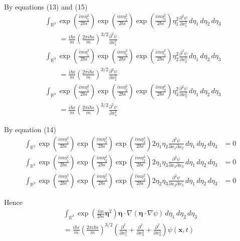 \documentclass[12pt]{article}
\begin{document}
By equations (13) and (15)
\begin{align*}
&\int_{\mathbb R^3}
\exp\left(\frac{im\eta_1^2}{2\hbar\epsilon}\right)
\exp\left(\frac{im\eta_2^2}{2\hbar\epsilon}\right)
\exp\left(\frac{im\eta_3^2}{2\hbar\epsilon}\right)
\eta_1^2\frac{\partial^2\psi}{\partial x_1^2}
\,d\eta_1\,d\eta_2\,d\eta_3
\\
&\qquad{}=\frac{i\hbar\epsilon}{m}\left(\frac{2\pi i\hbar\epsilon}{m}\right)^{3/2}
\frac{\partial^2\psi}{\partial x_1^2}
\\
&\int_{\mathbb R^3}
\exp\left(\frac{im\eta_1^2}{2\hbar\epsilon}\right)
\exp\left(\frac{im\eta_2^2}{2\hbar\epsilon}\right)
\exp\left(\frac{im\eta_3^2}{2\hbar\epsilon}\right)
\eta_2^2\frac{\partial^2\psi}{\partial x_2^2}
\,d\eta_1\,d\eta_2\,d\eta_3
\\
&\qquad{}=\frac{i\hbar\epsilon}{m}\left(\frac{2\pi i\hbar\epsilon}{m}\right)^{3/2}
\frac{\partial^2\psi}{\partial x_2^2}
\\
&\int_{\mathbb R^3}
\exp\left(\frac{im\eta_1^2}{2\hbar\epsilon}\right)
\exp\left(\frac{im\eta_2^2}{2\hbar\epsilon}\right)
\exp\left(\frac{im\eta_3^2}{2\hbar\epsilon}\right)
\eta_3^2\frac{\partial^2\psi}{\partial x_3^2}
\,d\eta_1\,d\eta_2\,d\eta_3
\\
&\qquad{}=\frac{i\hbar\epsilon}{m}\left(\frac{2\pi i\hbar\epsilon}{m}\right)^{3/2}
\frac{\partial^2\psi}{\partial x_3^2}
\end{align*}

By equation (14)
\begin{align*}
\int_{\mathbb R^3}
\exp\left(\frac{im\eta_1^2}{2\hbar\epsilon}\right)
\exp\left(\frac{im\eta_2^2}{2\hbar\epsilon}\right)
\exp\left(\frac{im\eta_3^2}{2\hbar\epsilon}\right)
2\eta_1\eta_2\frac{\partial^2\psi}{\partial x_1\partial x_2}
\,d\eta_1\,d\eta_2\,d\eta_3
&=0
\\
\int_{\mathbb R^3}
\exp\left(\frac{im\eta_1^2}{2\hbar\epsilon}\right)
\exp\left(\frac{im\eta_2^2}{2\hbar\epsilon}\right)
\exp\left(\frac{im\eta_3^2}{2\hbar\epsilon}\right)
2\eta_1\eta_3\frac{\partial^2\psi}{\partial x_1\partial x_3}
\,d\eta_1\,d\eta_2\,d\eta_3
&=0
\\
\int_{\mathbb R^3}
\exp\left(\frac{im\eta_1^2}{2\hbar\epsilon}\right)
\exp\left(\frac{im\eta_2^2}{2\hbar\epsilon}\right)
\exp\left(\frac{im\eta_3^2}{2\hbar\epsilon}\right)
2\eta_2\eta_3\frac{\partial^2\psi}{\partial x_2\partial x_3}
\,d\eta_1\,d\eta_2\,d\eta_3
&=0
\end{align*}

Hence
\begin{multline*}
\int_{\mathbb R^3}
\exp\left(\frac{im}{2\hbar\epsilon}\boldsymbol\eta^2\right)
\boldsymbol\eta\cdot\nabla(\boldsymbol\eta\cdot\nabla\psi)
\,d\eta_1\,d\eta_2\,d\eta_3
\\
{}=\frac{i\hbar\epsilon}{m}\left(\frac{2\pi i\hbar\epsilon}{m}\right)^{3/2}
\left(
\frac{\partial^2}{\partial x_1^2}+
\frac{\partial^2}{\partial x_2^2}+
\frac{\partial^2}{\partial x_3^2}
\right)\psi(\mathbf x,t)
\tag{18}
\end{multline*}
\end{document}
